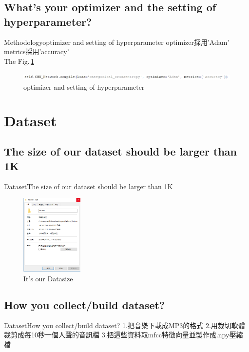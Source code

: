 \documentclass{beamer}
\begin{document}
\begin{CJK}{UTF8}{nkai}
\subsection{What's your optimizer and the setting of hyperparameter?}
\section{Dataset}
\subsection {The size of our dataset should be larger than 1K}
\begin{frame}{Dataset}{The size of our dataset should be larger than 1K}
\begin{figure}
\begin{center} 
\includegraphics[height=4cm]{1.png}
\end{center}
\caption{It's our Datasize} 
\end{figure}
\end{frame}
\subsection{How you collect/build  dataset?}
\begin{frame}{Dataset}{How you collect/build  dataset?}
1.把音樂下載成MP3的格式
\newline
\newline
\newline
2.用裁切軟體裁剪成每10秒一個人聲的音訊檔
\newline
\newline
\newline
3.把這些資料取mfcc特徵向量並製作成.npy壓縮檔
\end{frame}

\end{CJK}
\end{document}
